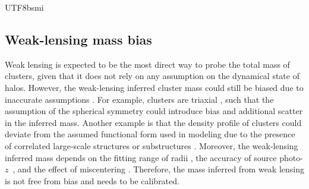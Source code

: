 \documentclass[longauth]{aa}
\newcommand{\redshift}{\ensuremath{z}}
\begin{document}
\begin{CJK*}{UTF8}{bsmi}
\subsection{Weak-lensing mass bias}
\label{sec:bwl}


Weak lensing is expected to be the most direct way to probe the total mass of clusters, given that it does not rely on any assumption on the dynamical state of halos.
However, the weak-lensing inferred cluster mass could still be biased due to inaccurate assumptions \citep[e.g.,][]{pratt19,umetsu20}.
For example, clusters are triaxial \citep{clowe04,corless07,chiu18b}, such that the assumption of the spherical symmetry could introduce bias and additional scatter in the inferred mass.
Another example is that the density profile of clusters could deviate from the assumed functional form used in modeling due to the presence of correlated large-scale structures or substructures \citep{clowe04,king07}.
Moreover, the weak-lensing inferred mass depends on the fitting range of radii \citep{applegate14}, the accuracy of source photo-\redshift\ \citep{kelly14}, and the effect of miscentering \citep{rozo11b,vonderlinden14a}.
Therefore, the mass inferred from weak lensing is not free from bias and needs to be calibrated.


\end{CJK*}
\end{document}
